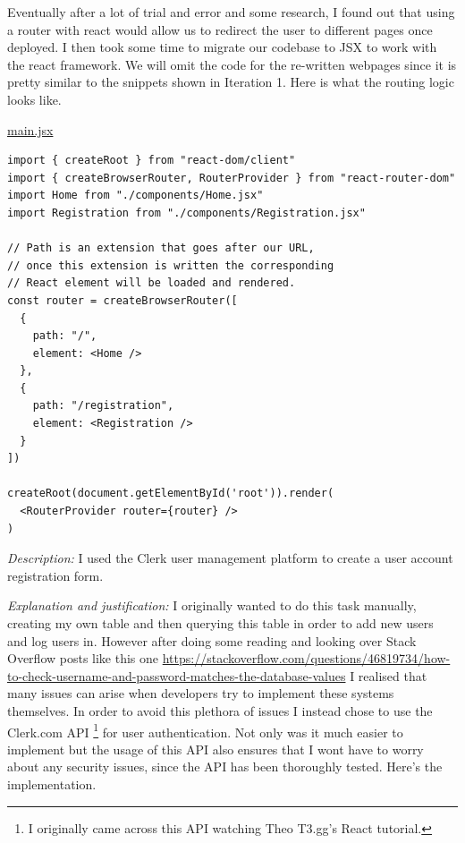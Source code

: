 Eventually after a lot of trial and error and some research,
I found out that using a router with react would allow us to
redirect the user to different pages once deployed. I then 
took some time to migrate our codebase to JSX to work with the
react framework. We will omit the code for the re-written
webpages since it is pretty similar to the snippets shown in 
Iteration 1. Here is what the routing logic looks like. \\
\vspace{0.2cm}

\underline{main.jsx} \\ \vspace{0.2cm}

\begin{verbatim}
import { createRoot } from "react-dom/client"
import { createBrowserRouter, RouterProvider } from "react-router-dom"
import Home from "./components/Home.jsx"
import Registration from "./components/Registration.jsx"

// Path is an extension that goes after our URL,
// once this extension is written the corresponding
// React element will be loaded and rendered.
const router = createBrowserRouter([
  {
    path: "/",
    element: <Home />
  },
  {
    path: "/registration",
    element: <Registration />
  }
])

createRoot(document.getElementById('root')).render(
  <RouterProvider router={router} />
)
\end{verbatim}

\textit{Description:} I used the Clerk user management
platform to create a user account registration form.\\
\vspace{0.2cm}

\textit{Explanation and justification:} I originally wanted to 
do this task manually, creating my own table and then querying
this table in order to add new users and log users in. However
after doing some reading and looking over Stack Overflow posts 
like this one \url{https://stackoverflow.com/questions/46819734/how-to-check-username-and-password-matches-the-database-values}
I realised that many issues can arise when developers try to 
implement these systems themselves. In order to avoid this 
plethora of issues I instead chose to use the Clerk.com API 
\footnote{I originally came across this API watching Theo T3.gg's 
React tutorial.}
for user authentication. Not only was it much easier to implement
but the usage of this API also ensures that I wont have to worry
about any security issues, since the API has been thoroughly
tested. Here's the implementation. \\ \vspace{0.2cm}

